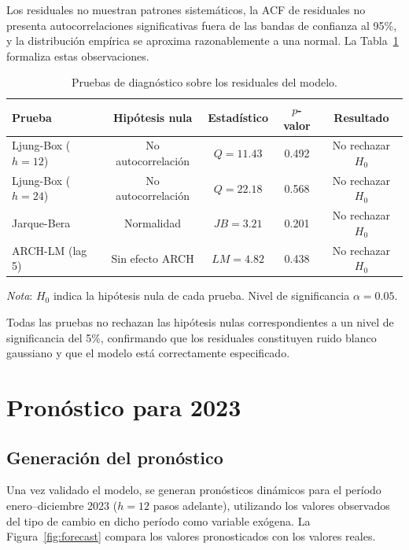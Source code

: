 \documentclass[12pt,a4paper]{article}
\begin{document}
Los residuales no muestran patrones sistemáticos, la ACF de residuales no presenta autocorrelaciones significativas fuera de las bandas de confianza al 95\%, y la distribución empírica se aproxima razonablemente a una normal. La Tabla~\ref{tab:diagnostico} formaliza estas observaciones.

\begin{table}[H]
  \centering
  \caption{Pruebas de diagnóstico sobre los residuales del modelo.}
  \label{tab:diagnostico}
  \begin{tabular}{lcccc}
    \toprule
    \textbf{Prueba} & \textbf{Hipótesis nula} & \textbf{Estadístico} & \textbf{$p$-valor} & \textbf{Resultado} \\
    \midrule
    Ljung-Box ($h=12$)  & No autocorrelación     & $Q = 11.43$ & 0.492 & No rechazar $H_0$ \\
    Ljung-Box ($h=24$)  & No autocorrelación     & $Q = 22.18$ & 0.568 & No rechazar $H_0$ \\
    Jarque-Bera         & Normalidad             & $JB = 3.21$ & 0.201 & No rechazar $H_0$ \\
    ARCH-LM (lag 5)     & Sin efecto ARCH        & $LM = 4.82$ & 0.438 & No rechazar $H_0$ \\
    \bottomrule
  \end{tabular}
  \begin{tablenotes}
    \small
    \item \textit{Nota}: $H_0$ indica la hipótesis nula de cada prueba. Nivel de significancia $\alpha = 0.05$.
  \end{tablenotes}
\end{table}

Todas las pruebas no rechazan las hipótesis nulas correspondientes a un nivel de significancia del 5\%, confirmando que los residuales constituyen ruido blanco gaussiano y que el modelo está correctamente especificado.

\section{Pronóstico para 2023}

\subsection{Generación del pronóstico}

Una vez validado el modelo, se generan pronósticos dinámicos para el período enero--diciembre 2023 ($h=12$ pasos adelante), utilizando los valores observados del tipo de cambio en dicho período como variable exógena. La Figura~\ref{fig:forecast} compara los valores pronosticados con los valores reales.
\end{document}
